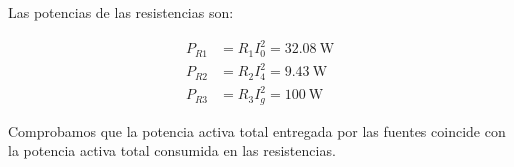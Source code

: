 \documentclass[12pt]{article}
\begin{document}
Las potencias de las resistencias son:

\begin{align*}
  P_{R1} &= R_1 I_0^2 = \SI{32.08}{\watt}\\ 
  P_{R2} &= R_2 I_4^2 = \SI{9.43}{\watt}\\ 
  P_{R3} &= R_3 I_g^2 = \SI{100}{\watt}
\end{align*}

Comprobamos que la potencia activa total entregada por las fuentes coincide con la potencia activa total consumida en las resistencias.
\end{document}
